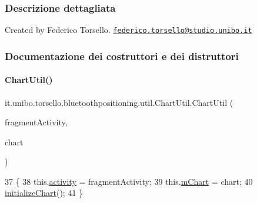 \subsubsection{Descrizione dettagliata}
Created by Federico Torsello. \href{mailto:federico.torsello@studio.unibo.it}{\tt federico.\+torsello@studio.\+unibo.\+it} 

\subsubsection{Documentazione dei costruttori e dei distruttori}
\hypertarget{classit_1_1unibo_1_1torsello_1_1bluetoothpositioning_1_1util_1_1ChartUtil_a970bbc9180f662f25db53309407d562d_a970bbc9180f662f25db53309407d562d}{}\label{classit_1_1unibo_1_1torsello_1_1bluetoothpositioning_1_1util_1_1ChartUtil_a970bbc9180f662f25db53309407d562d_a970bbc9180f662f25db53309407d562d} 
\paragraph{\texorpdfstring{Chart\+Util()}{ChartUtil()}}
{\footnotesize\ttfamily it.\+unibo.\+torsello.\+bluetoothpositioning.\+util.\+Chart\+Util.\+Chart\+Util (\begin{DoxyParamCaption}\item[{Fragment\+Activity}]{fragment\+Activity,  }\item[{Line\+Chart}]{chart }\end{DoxyParamCaption})}


\begin{DoxyCode}
37                                                                          \{
38         this.\hyperlink{classit_1_1unibo_1_1torsello_1_1bluetoothpositioning_1_1util_1_1ChartUtil_acf9c1988f7aaacc3f3354ac7e9eeef6a_acf9c1988f7aaacc3f3354ac7e9eeef6a}{activity} = fragmentActivity;
39         this.\hyperlink{classit_1_1unibo_1_1torsello_1_1bluetoothpositioning_1_1util_1_1ChartUtil_a60b5bd6796cc5dcde12d9a6bb3e67c86_a60b5bd6796cc5dcde12d9a6bb3e67c86}{mChart} = chart;
40         \hyperlink{classit_1_1unibo_1_1torsello_1_1bluetoothpositioning_1_1util_1_1ChartUtil_aab1a6bd41cbf8228c53d633af6b89bb7_aab1a6bd41cbf8228c53d633af6b89bb7}{initializeChart}();
41     \}
\end{DoxyCode}


